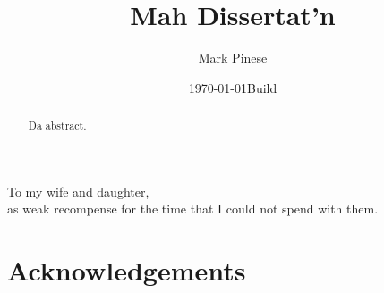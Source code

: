\documentclass[11pt,a4paper,final,oneside]{memoir}
\begin{document}
\pagestyle{empty}

\listoffixmes

\increaseBuild

\title{Mah Dissertat'n}
\author{Mark Pinese}
\date{\today \quad Build \version}

\maketitle



\frontmatter

\cleardoublepage
{}
\begin{adjustwidth}{2em}{2em}
\noindent %
To my wife and daughter, \\
as weak recompense for the time that I could not spend with them.
\end{adjustwidth}

\chapter*{Acknowledgements}
\thispagestyle{empty}
\clearpage

\begin{abstract}
Da abstract.
\end{abstract}
\thispagestyle{empty}
\clearpage

\pagestyle{plain}

\tableofcontents
\clearpage

\listoffigures
\clearpage

\listoftables

\listofalgorithms

\openany




\mainmatter
\openright





%




\backmatter

\printglossary

\renewcommand{\bibname}{References}


\end{document}
